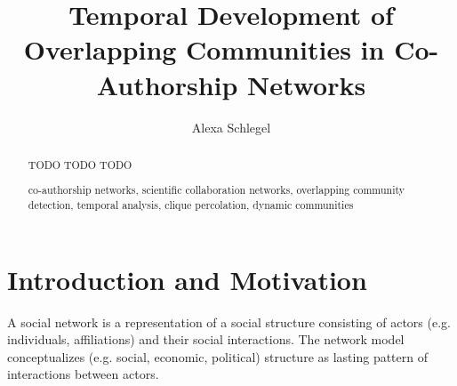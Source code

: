 \documentclass[runningheads,a4paper]{llncs}
\newcommand{\keywords}[1]{\par\addvspace\baselineskip
\noindent\keywordname\enspace\ignorespaces#1}
\begin{document}
\mainmatter  %

\title{Temporal Development of Overlapping Communities in Co-Authorship Networks}


%
%
\author{Alexa Schlegel%
}
%


%
%

\maketitle


\begin{abstract}
TODO TODO TODO
\keywords{co-authorship networks, scientific collaboration networks, overlapping community detection, temporal analysis, clique percolation, dynamic communities}
\end{abstract}

\section{Introduction and Motivation}
A social network is a representation of a social structure consisting of actors (e.g. individuals, affiliations) and their social interactions.
The network model conceptualizes (e.g. social, economic, political) structure as lasting pattern of interactions between actors.~\cite{wasserman1994social}
\end{document}
